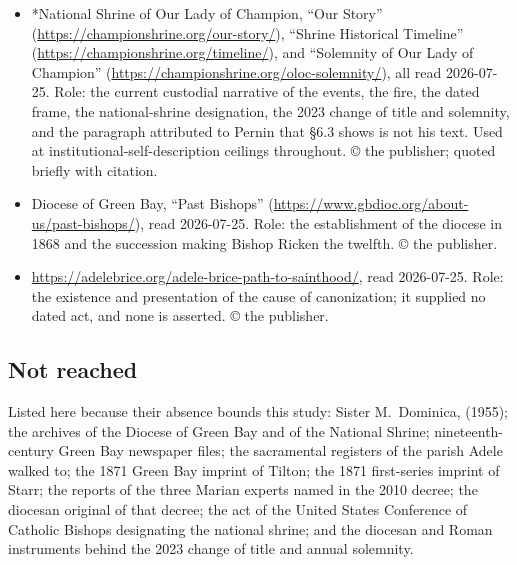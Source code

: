 \begin{itemize}
\item *National Shrine of Our Lady of Champion, ``Our Story''
(\url{https://championshrine.org/our-story/}), ``Shrine Historical
Timeline'' (\url{https://championshrine.org/timeline/}), and
``Solemnity of Our Lady of Champion''
(\url{https://championshrine.org/oloc-solemnity/}), all read
2026-07-25. Role: the current custodial narrative of the events, the
fire, the dated frame, the national-shrine designation, the 2023 change
of title and solemnity, and the paragraph attributed to Pernin that
\S6.3 shows is not his text. Used at institutional-self-description
ceilings throughout. \copyright{} the publisher; quoted briefly with
citation.
\item Diocese of Green Bay, ``Past Bishops''
(\url{https://www.gbdioc.org/about-us/past-bishops/}), read 2026-07-25.
Role: the establishment of the diocese in 1868 and the succession
making Bishop Ricken the twelfth. \copyright{} the publisher.
\item \url{https://adelebrice.org/adele-brice-path-to-sainthood/},
read 2026-07-25. Role: the existence and presentation of the cause of
canonization; it supplied no dated act, and none is asserted.
\copyright{} the publisher.
\end{itemize}

\subsection*{Not reached}

Listed here because their absence bounds this study: Sister
M.~Dominica,  (1955); the
archives of the Diocese of Green Bay and of the National Shrine;
nineteenth-century Green Bay newspaper files; the sacramental registers
of the parish Adele walked to; the 1871 Green Bay imprint of Tilton;
the 1871 first-series imprint of Starr; the reports of the three Marian
experts named in the 2010 decree; the diocesan original of that decree;
the act of the United States Conference of Catholic Bishops designating
the national shrine; and the diocesan and Roman instruments behind the
2023 change of title and annual solemnity.
